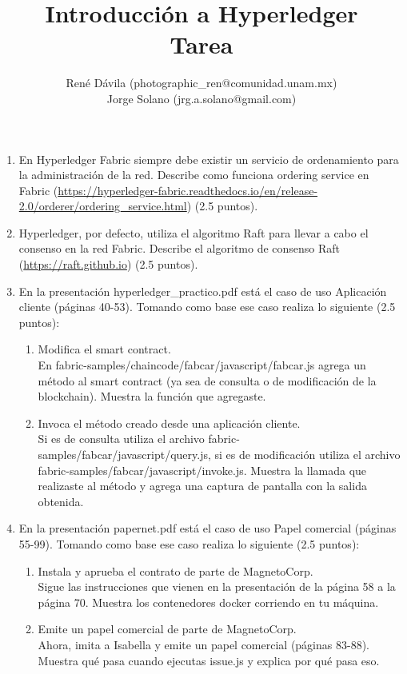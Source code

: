 \documentclass[12pt]{article}
\title{Introducción a Hyperledger \\Tarea}
\author{René Dávila (photographic\_ren@comunidad.unam.mx) \\ Jorge Solano (jrg.a.solano@gmail.com)}
\date{ }
\begin{document}
	\maketitle
	
	\begin{enumerate}
		\item En Hyperledger Fabric siempre debe existir un servicio de ordenamiento para la administración de la red. Describe como funciona ordering service en Fabric (\url{https://hyperledger-fabric.readthedocs.io/en/release-2.0/orderer/ordering\_service.html}) (2.5 puntos).
		
		\item Hyperledger, por defecto, utiliza el algoritmo Raft para llevar a cabo el consenso en la red Fabric. Describe el algoritmo de consenso Raft (\url{https://raft.github.io}) (2.5 puntos).
		
		\item En la presentación hyperledger\_practico.pdf está el caso de uso Aplicación cliente (páginas 40-53). Tomando como base ese caso realiza lo siguiente (2.5 puntos):
		\begin{enumerate}
			\item Modifica el smart contract.\\
			En fabric-samples/chaincode/fabcar/javascript/fabcar.js agrega un método al smart contract (ya sea de consulta o de modificación de la blockchain). Muestra la función que agregaste.
			\item Invoca el método creado desde una aplicación cliente.\\
			Si es de consulta utiliza el archivo fabric-samples/fabcar/javascript/query.js, si es de modificación utiliza el archivo fabric-samples/fabcar/javascript/invoke.js. Muestra la llamada que realizaste al método y agrega una captura de pantalla con la salida obtenida.
		\end{enumerate}
	
		\item En la presentación papernet.pdf está el caso de uso Papel comercial (páginas 55-99). Tomando como base ese caso realiza lo siguiente (2.5 puntos):
		\begin{enumerate}
			\item Instala y aprueba el contrato de parte de MagnetoCorp.\\
			Sigue las instrucciones que vienen en la presentación de la página 58 a la página 70. Muestra los contenedores docker corriendo en tu máquina.
			\item Emite un papel comercial de parte de MagnetoCorp.\\
			Ahora, imita a Isabella y emite un papel comercial (páginas 83-88). Muestra qué pasa cuando ejecutas issue.js y explica por qué pasa eso.
		\end{enumerate}
	\end{enumerate}
\end{document}
